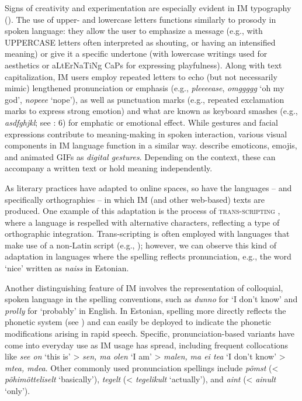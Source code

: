 \documentclass[output=paper]{langscibook}
\begin{document}
Signs of creativity and experimentation are especially evident in IM typography (\citealt{VarnhagenEtAl2010, Herring2022}). The use of upper- and lowercase letters functions similarly to prosody in spoken language: they allow the user to emphasize a message (e.g., with UPPERCASE letters often interpreted as shouting, or having an intensified meaning) or give it a specific undertone (with lowercase writings used for aesthetics or aLtErNaTiNg CaPs for expressing playfulness). Along with text capitalization, IM users employ repeated letters to echo (but not necessarily mimic) lengthened pronunciation or emphasis (e.g., \textit{pleeeease}, \textit{omggggg} ‘oh my god’, \textit{nopeee} ‘nope’), as well as punctuation marks (e.g., repeated exclamation marks to express strong emotion) and what are known as keyboard smashes (e.g., \textit{asdfghjkl}; see \citealt{McCulloch2019}: 6) for emphatic or emotional effect. While gestures and facial expressions contribute to meaning-making in spoken interaction, various visual components in IM language function in a similar way. \citet{GawneMcCulloch2019} describe emoticons, emojis, and animated GIFs as \textit{digital gestures}. Depending on the context, these can accompany a written text or hold meaning independently. 

As literary practices have adapted to online spaces, so have the languages – and specifically orthographies – in which IM (and other web-based) texts are produced. One example of this adaptation is the process of \textsc{trans-scripting} \citep{Androutsopoulos2020}, where a language is respelled with alternative characters, reflecting a type of orthographic integration. Trans-scripting is often employed with languages that make use of a non-Latin script (e.g., \citealt{Su2003, Androutsopoulos2012}); however, we can observe this kind of adaptation in languages where the spelling reflects pronunciation, e.g., the word ‘nice’ written as \textit{naiss} in Estonian. 

Another distinguishing feature of IM involves the representation of colloquial, spoken language in the spelling conventions, such as \textit{dunno} for ‘I don’t know’ and \textit{prolly} for ‘probably’ in English. In Estonian, spelling more directly reflects the phonetic system (see ) and can easily be deployed to indicate the phonetic modifications arising in rapid speech. Specific, pronunciation-based variants have come into everyday use as IM usage has spread, including frequent collocations like \textit{see on} ‘this is’ > \textit{sen, ma olen} ‘I am’ > \textit{malen,} \textit{ma ei tea} ‘I don’t know’ > \textit{mtea, mdea}. Other commonly used pronunciation spellings include \textit{põmst} (< \textit{põhimõtteliselt} ‘basically’), \textit{tegelt} (< \textit{tegelikult} ‘actually’), and \textit{aint} (< \textit{ainult} ‘only’).
\end{document}
